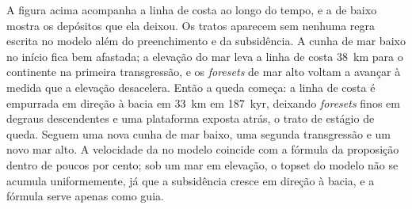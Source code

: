 A figura acima acompanha a linha de costa ao longo do tempo, e a de baixo
mostra os depósitos que ela deixou. Os tratos aparecem sem nenhuma regra escrita no
modelo além do preenchimento e da subsidência. A cunha de mar baixo no início fica
bem afastada; a elevação do mar leva a linha de costa \qty{38}{km} para o continente na
primeira transgressão, e os \textit{foresets} de mar alto voltam a avançar à medida que a elevação desacelera.
Então a queda começa: a linha de costa é empurrada em direção à bacia em \qty{33}{km} em
\qty{187}{kyr}, deixando \textit{foresets} finos em degraus descendentes e uma plataforma exposta
atrás, o trato de estágio de queda. Seguem uma nova cunha de mar baixo, uma segunda transgressão
e um novo mar alto. A velocidade da  no modelo
coincide com a fórmula da proposição dentro de poucos por cento; sob um mar em
elevação, o topset do modelo não se acumula uniformemente, já que a subsidência
cresce em direção à bacia, e a fórmula serve apenas como guia.

